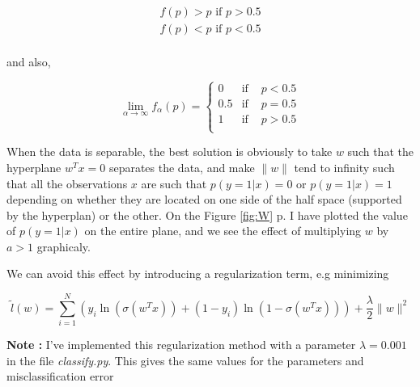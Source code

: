 \documentclass[a4paper, 11pt]{article}
\newenvironment{note}
{\begin{framed} \textbf{Note : }}
{\end{framed}}
\newcommand{\file}[1]{\emph{#1}}
\newcommand{\Figure}[1]{Figure \ref{#1} p. \pageref{#1}}
\newcommand{\norm}[1]{\|#1\|}
\begin{document}
\begin{equation*}
  \begin{array}{l}
    f(p) > p \text{ if } p > 0.5 \\
    f(p) < p \text{ if } p < 0.5 \\
  \end{array}
\end{equation*}

and also,

\begin{equation*}
  \lim_{\alpha \rightarrow \infty}f_\alpha(p) =
  \left\{
  \begin{array}{lll}
    0 &\text{if } &p < 0.5 \\
    0.5 &\text{if } &p = 0.5 \\
    1 &\text{if } &p > 0.5 \\
  \end{array}
  \right.
\end{equation*}

When the data is separable, the best solution is obviously to take
$w$ such that the hyperplane $w^T x = 0$ separates the data, and
make $\norm{w}$ tend to infinity such that all the observations
$x$ are such that $p(y = 1 | x) = 0$ or $p(y = 1 | x) = 1$
depending on whether they are located on one side of the half
space (supported by the hyperplan) or the other. On the
\Figure{fig:W} I have plotted the value of $p(y = 1 | x)$
on the entire plane, and we see the effect of multiplying $w$ by $a > 1$
graphicaly.

We can avoid this effect by introducing a regularization term, e.g
minimizing

\begin{equation*}
  \tilde{l}(w) = \sum_{i = 1}^N \left(y_i \ln{(\sigma(w^T x))} + (1 - y_i) \ln{(1 - \sigma{(w^T x)})} \right) + \dfrac{\lambda}{2} \norm{w}^2
\end{equation*}

\begin{note}
  I've implemented this regularization method with a parameter
  $\lambda = 0.001$ in the file \file{classify.py}. This gives
  the same values for the parameters and misclassification error
\end{note}
\end{document}
